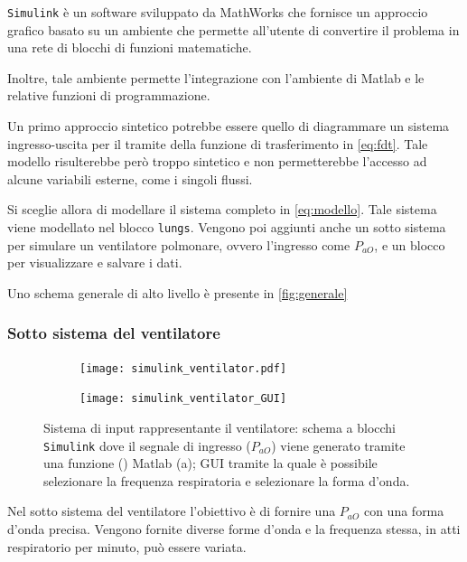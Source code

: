  \texttt{Simulink} \cite{simulink} è un software sviluppato da MathWorks che fornisce un approccio grafico basato su un ambiente che permette all'utente di convertire il problema in una rete di blocchi di funzioni matematiche. 

Inoltre, tale ambiente permette l'integrazione con l'ambiente di Matlab e le relative funzioni di programmazione. 

Un primo approccio sintetico potrebbe essere quello di diagrammare un sistema ingresso-uscita per il tramite della funzione di trasferimento in \cref{eq:fdt}. Tale modello risulterebbe però troppo sintetico e non permetterebbe l'accesso ad alcune variabili esterne, come i singoli flussi.

Si sceglie allora di modellare il sistema completo in \cref{eq:modello}. Tale sistema viene modellato nel blocco \texttt{lungs}. Vengono poi aggiunti anche un sotto sistema per simulare un ventilatore polmonare, ovvero l'ingresso come $P_{aO}$, e un blocco per visualizzare e salvare i dati.

Uno schema generale di alto livello è presente in \cref{fig:generale}


\subsubsection{Sotto sistema del ventilatore}


\begin{figure}[t!]
	\centering
	\begin{subfigure}{0.4\linewidth}
		\centering
		\texttt{[image: simulink\_ventilator.pdf]}
		\caption{}
	\end{subfigure}\hfill
	\begin{subfigure}{0.6\linewidth}
		\centering
		\texttt{[image: simulink\_ventilator\_GUI]}
		\caption{}
		\label{fig:mask}
	\end{subfigure}\hfill
	\caption{Sistema di input rappresentante il ventilatore: schema a blocchi  \texttt{Simulink} dove il segnale di ingresso ($P_{aO}$) viene generato tramite una funzione () Matlab (a); GUI tramite la quale è possibile selezionare la frequenza respiratoria e selezionare la forma d'onda.}
\end{figure}


Nel sotto sistema del ventilatore l'obiettivo è di fornire una $P_{aO}$ con una forma d'onda precisa. Vengono fornite diverse forme d'onda e la frequenza stessa, in atti respiratorio per minuto, può essere variata.

